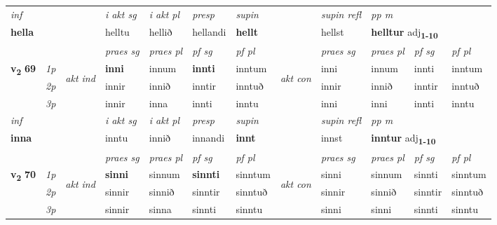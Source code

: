 \begin{longtable}[l]{X>{\footnotesize\itshape}llXXXXlXXXX}
\cmidrule{4-7}
   {\textit{inf}} & &  & \textit{i akt sg} & \textit{i akt pl}   & \textit{presp} & \textit{supin} && \textit{supin refl} & \textit{pp m} \\*
  {\textbf{hella}} & && helltu  & hellið   & hellandi &  \textbf{hellt} && hellst & \multicolumn{2}{l}{\textbf{helltur} adj\textbf{\textsubscript{1-10}}} \\*

\midrule

 & &   & \textit{praes sg}  & \textit{praes pl}    & \textit{ pf sg} & \textit{pf pl} & & \textit{praes sg}  & \textit{praes pl}    & \textit{pf sg} & \textit{pf pl }  \\ \cmidrule{4-7} \cmidrule{9-12}
 \multirow{2}{*}{{{\textbf{v{\textsubscript{2}}} \Large{\textbf{69}}}}}  & 1p & \multirow{3}{*}{\begin{turn}{90}\textit{akt ind}\end{turn}} & \textbf{inni} & innum & \textbf{innti} & inntum & \multirow{3}{*}{\begin{turn}{90}\textit{akt con}\end{turn}} &inni & innum & innti & inntum\\*
 & 2p &  &  innir  & innið & inntir & inntuð & & innir & innið & inntir & inntuð \\*
 & 3p &  & innir & inna & innti & inntu & & inni & inni& innti & inntu \\*
\cmidrule{4-7} \cmidrule{9-12}

   {\textit{inf}} & &  & \textit{i akt sg} & \textit{i akt pl}   & \textit{presp} & \textit{supin} && \textit{supin refl} & \textit{pp m} \\*
  {\textbf{inna}} & && inntu  & innið   & innandi &  \textbf{innt} && innst & \multicolumn{2}{l}{\textbf{inntur} adj\textbf{\textsubscript{1-10}}} \\*

\midrule

 & &   & \textit{praes sg}  & \textit{praes pl}    & \textit{ pf sg} & \textit{pf pl} & & \textit{praes sg}  & \textit{praes pl}    & \textit{pf sg} & \textit{pf pl }  \\ \cmidrule{4-7} \cmidrule{9-12}
 \multirow{2}{*}{{{\textbf{v{\textsubscript{2}}} \Large{\textbf{70}}}}}  & 1p & \multirow{3}{*}{\begin{turn}{90}\textit{akt ind}\end{turn}} & \textbf{sinni} & sinnum & \textbf{sinnti} & sinntum & \multirow{3}{*}{\begin{turn}{90}\textit{akt con}\end{turn}} &sinni & sinnum & sinnti & sinntum\\*
 & 2p &  &  sinnir  & sinnið & sinntir & sinntuð & & sinnir & sinnið & sinntir & sinntuð \\*
 & 3p &  & sinnir & sinna & sinnti & sinntu & & sinni & sinni& sinnti & sinntu \\*
\cmidrule{4-7} \cmidrule{9-12}


\end{longtable}
